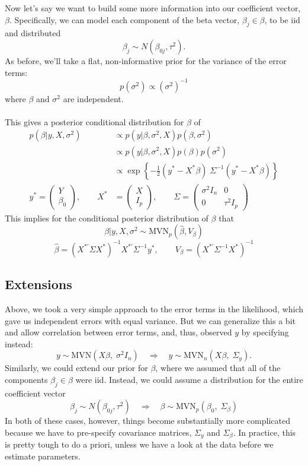 \documentclass[a4paper,12pt]{scrartcl}
\begin{document}
Now let's say we want to build some more information into our coefficient
vector, $\beta$. Specifically, we can model each component of the
beta vector, $\beta_j \in \beta$, to be iid and distributed
   \[ \beta_j \sim N(\beta_{0j}, \tau^2). \]
As before, we'll take a flat, non-informative prior for the variance of 
the error terms:
   \[ p(\sigma^2) \propto (\sigma^2)^{-1} \]
where $\beta$ and $\sigma^2$ are independent.
\\
\\
This gives a posterior conditional distribution for $\beta$ of 
\begin{align*}
   p(\beta | y, X, \sigma^2) &\propto p(y|\beta, \sigma^2, X) 
      p(\beta, \sigma^2) \\
   &\propto p(y|\beta, \sigma^2, X)  p(\beta) p(\sigma^2) \\
   &\propto \exp\left\{ -\frac{1}{2} (y^* - X^*\beta) \; \Sigma^{-1}
      (y^* - X^*\beta) \right\} \\
   y^* = \begin{pmatrix} Y \\ \beta_0 \end{pmatrix}, \qquad 
   X^* &= \begin{pmatrix} X \\ I_p \end{pmatrix}, \qquad 
   \Sigma = \begin{pmatrix} \sigma^2 I_n & 0 \\
      0 & \tau^2 I_p \end{pmatrix}  
\end{align*}
This implies for the conditional posterior distribution of $\beta$
that
   \[ \beta|y, X, \sigma^2 \sim \text{MVN}_p(\hat{\beta}, V_\beta) \]
   \[ \hat{\beta} = (X^{*'} \Sigma X^*)^{-1} X^{*'} \Sigma^{-1} y^*,
      \qquad V_\beta = (X^{*'} \Sigma^{-1} X^*)^{-1} \]

\subsection{Extensions}

Above, we took a very simple approach to the error terms in the 
likelihood, which gave us independent errors with equal variance.
But we can generalize this a bit and allow correlation between error
terms, and, thus, observed $y$ by specifying instead:
   \[ y \sim \text{MVN}( X\beta,\; \sigma^2 I_n)\quad \Rightarrow \quad
      y \sim \text{MVN}_n( X\beta, \;\Sigma_y).\]
Similarly, we could extend our prior for $\beta$, where we assumed that
all of the components $\beta_j \in \beta$ were iid. 
Instead, we could assume a distribution for the entire coefficient 
vector
   \[ \beta_j \sim N(\beta_{0j}, \tau^2) \quad \Rightarrow \quad
      \beta \sim \text{MVN}_p(\beta_0, \; \Sigma_\beta) \]
In both of these cases, however, things become substantially more
complicated because we have to pre-specify covariance matrices, 
$\Sigma_y$ and $\Sigma_\beta$. In practice, this is pretty tough
to do a priori, 
unless we have a look at the data before we estimate parameters.
\end{document}

